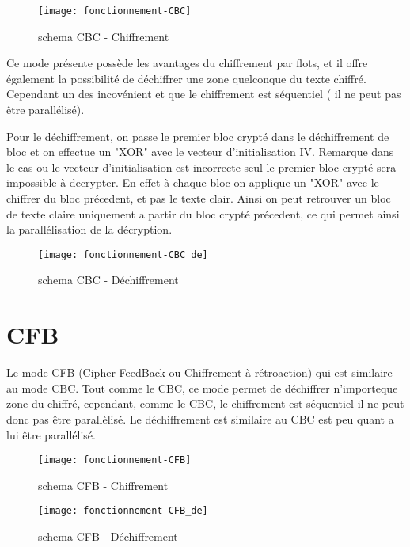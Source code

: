 \begin{figure}[!h]
  \centering
  \texttt{[image: fonctionnement-CBC]}
  \caption{schema CBC - Chiffrement \cite{wiki}}
  \label{schema CBC - Chiffrement}
\end{figure}

Ce mode présente possède les avantages du chiffrement par flots, et il offre également la possibilité de déchiffrer une zone quelconque du texte chiffré. Cependant un des incovénient et que le chiffrement est séquentiel ( \cad il ne peut pas être parallélisé).

Pour le déchiffrement, on passe le premier bloc crypté dans le déchiffrement de bloc et on effectue un "XOR" avec le vecteur d'initialisation IV. Remarque dans le cas ou le vecteur d'initialisation est incorrecte seul le premier bloc crypté sera impossible à decrypter. En effet à chaque bloc on applique un "XOR" avec le chiffrer du bloc précedent, et pas le texte clair. Ainsi on peut retrouver un bloc de texte claire uniquement a partir du bloc crypté précedent, ce qui permet ainsi la parallélisation de la décryption. 

\begin{figure}[!h]
  \centering
  \texttt{[image: fonctionnement-CBC\_de]}
  \caption{schema CBC - Déchiffrement}
  \label{schema CBC - Déchiffrement}
\end{figure}




\section{CFB}
Le mode CFB (Cipher FeedBack ou Chiffrement à rétroaction) qui est similaire au mode CBC. Tout comme le CBC, ce mode permet de déchiffrer n'importeque zone du chiffré, cependant, comme le CBC, le chiffrement est séquentiel il ne peut donc pas être parallèlisé. Le déchiffrement est similaire au CBC est peu quant a lui être parallélisé. 

\begin{figure}[!h]
  \centering
  \texttt{[image: fonctionnement-CFB]}
  \caption{schema CFB - Chiffrement}
  \label{schema CFB - Chiffrement}
\end{figure}

\begin{figure}[!h]
  \centering
  \texttt{[image: fonctionnement-CFB\_de]}
  \caption{schema CFB - Déchiffrement}
  \label{schema CFB - Déchiffrement}
\end{figure}

